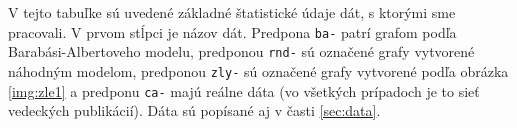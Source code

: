\begin{landscape}
\begin{table}[h]
{\begin{tabular}{l|rrrrrrr}
	\end{tabular}
	}
	\smallskip\par
	{\footnotesize V tejto tabuľke sú uvedené základné štatistické údaje dát, 
		s ktorými sme pracovali. V prvom stĺpci je názov dát. Predpona 
		\texttt{ba-} patrí grafom podľa Barabási-Albertoveho modelu, predponou 
		\texttt{rnd-} sú označené grafy vytvorené náhodným modelom, predponou 
		\texttt{zly-} sú označené grafy vytvorené podľa obrázka \ref{img:zle1} 
		a predponu \texttt{ca-} majú reálne dáta (vo všetkých prípadoch je to 
		sieť vedeckých publikácií). Dáta sú popísané aj v časti \ref{sec:data}.}
	\label{table:stats}
\end{table}
\end{landscape}

